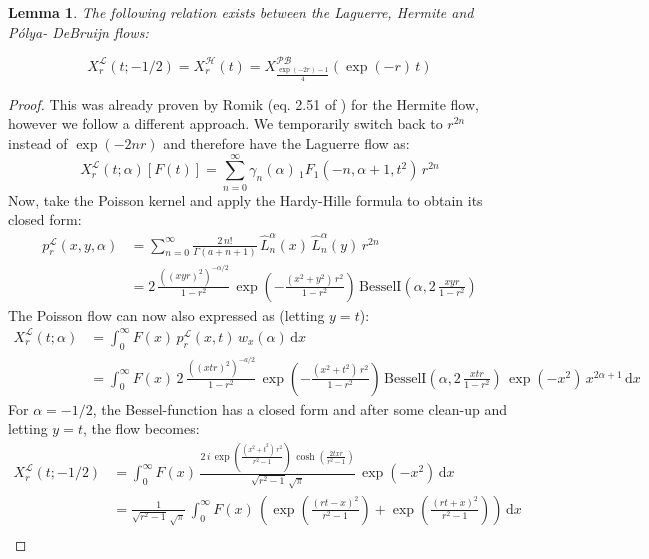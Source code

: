 \documentclass[a4paper,11pt,twoside]{amsart}
\newtheorem{lemma}[theorem]{Lemma}
\newcommand{\verifiedeq}{=}
\newcommand{\verifiedeq}{\stackrel{\checkmark}{=}}
\begin{document}
\begin{lemma} \label{LagisPB} The following relation exists between the Laguerre, Hermite and Pólya- DeBruijn flows:

\begin{equation}
X^{\mathcal{L}}_r\left(t;-1/2\right) = X^{\mathcal{H}}_r\left(t\right) = X^{\mathcal{PB}}_{\tfrac{\exp(-2r)-1}{4}}\left(\exp(-r)\,t\right) 
\end{equation} 
\end{lemma}
\begin{proof}
This was already proven by Romik (eq. 2.51 of \cite{rom}) for the Hermite flow, however we follow a different approach. We temporarily switch back to $r^{2n}$ instead of $\exp(-2nr)$ and therefore have the Laguerre flow as:
\begin{equation}
  X^{\mathcal{L}}_r(t;\alpha)\left[F(t)\right] \verifiedeq \sum_{n=0}^\infty \gamma_n(\alpha)\,{}_1F_1\left(-n, \alpha+1,t^2\right)\,r^{2n}
\end{equation}
Now, take the Poisson kernel and apply the Hardy-Hille formula to obtain its closed form:
\begin{align}
  p^\mathcal{L}_r(x,y, \alpha) &= \sum_{n=0}^\infty \frac{2\,n!}{\Gamma(a+n+1)}\,\hat{L}^{\alpha}_n(x)\,\hat{L}^{\alpha}_n(y)\,r^{2n} \\
  &=2\,\frac{\left((x y r)^2\right)^{-\alpha/2}}{1-r^2}\,\exp\left(-\frac{(x^2+y^2)\,r^2}{1-r^2}\right)\,\text{BesselI}\left(\alpha, 2\,\frac{x y r}{1-r^2}\right) \label{lagpoiclosed}
\end{align}
The Poisson flow can now also expressed as (letting $y=t$): 
\begin{align}
X^{\mathcal{L}}_r(t;\alpha) &\verifiedeq \int_0^\infty F(x)\,p^\mathcal{L}_r(x,t)\,w_x(\alpha) \,\mathrm{d} x \\
   &\verifiedeq \int_0^\infty F(x)\,2\,\frac{\left((x t r)^2\right)^{-a/2}}{1-r^2}\,\exp\left(-\frac{(x^2+t^2)\,r^2}{1-r^2}\right)\,\text{BesselI}\left(\alpha, 2\,\frac{x t r}{1-r^2}\right)\,\exp(-x^2)\,x^{2\alpha+1} \,\mathrm{d} x
\end{align}
For $\alpha = -1/2$, the Bessel-function has a closed form and after some clean-up and letting $y=t$, the flow becomes:
\begin{align}
X^{\mathcal{L}}_r(t;-1/2) &= \int_0^\infty F(x)\,\frac{2\,i\,\exp\left(\frac{(x^2+t^2)\,r^2}{r^2-1}\right)\,\cosh\left(\frac{2 t x r}{r^2-1}\right)}{\sqrt{r^2-1}\,\sqrt{\pi}}\,\exp(-x^2)\,\mathrm{d} x \\
&= \frac{1}{\sqrt{r^2-1}\,\sqrt{\pi}}\, \int_0^\infty F(x)\,\left(\exp\left(\frac{(r t -x)^2}{r^2-1}\right)+\exp\left(\frac{(r t +x)^2}{r^2-1}\right)\right)\,\mathrm{d} x \\

\end{align}
\end{proof}
\end{document}
